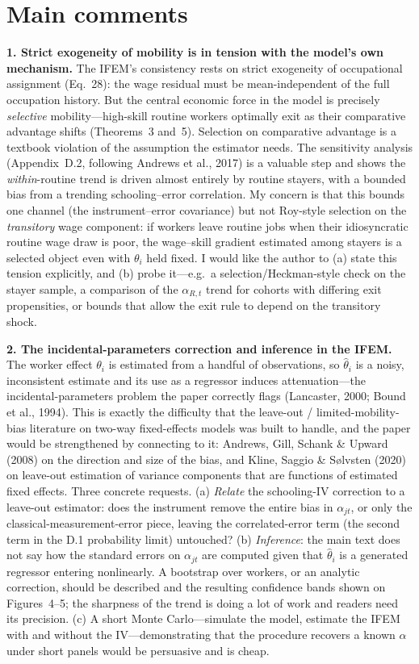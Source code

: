 \documentclass[11pt]{article}
\begin{document}
\section*{Main comments}

\textbf{1. Strict exogeneity of mobility is in tension with the model's own mechanism.}
The IFEM's consistency rests on strict exogeneity of occupational assignment (Eq.~28): the wage
residual must be mean-independent of the full occupation history. But the central economic force in
the model is precisely \emph{selective} mobility---high-skill routine workers optimally exit as their
comparative advantage shifts (Theorems~3 and~5). Selection on comparative advantage is a textbook
violation of the assumption the estimator needs. The sensitivity analysis (Appendix~D.2, following
Andrews et al., 2017) is a valuable step and shows the \emph{within}-routine trend is driven almost
entirely by routine stayers, with a bounded bias from a trending schooling--error correlation. My
concern is that this bounds one channel (the instrument--error covariance) but not Roy-style
selection on the \emph{transitory} wage component: if workers leave routine jobs when their
idiosyncratic routine wage draw is poor, the wage--skill gradient estimated among stayers is a
selected object even with $\theta_i$ held fixed. I would like the author to (a) state this tension
explicitly, and (b) probe it---e.g.\ a selection/Heckman-style check on the stayer sample, a
comparison of the $\alpha_{R,t}$ trend for cohorts with differing exit propensities, or bounds that
allow the exit rule to depend on the transitory shock.

\textbf{2. The incidental-parameters correction and inference in the IFEM.}
The worker effect $\theta_i$ is estimated from a handful of observations, so $\hat\theta_i$ is a
noisy, inconsistent estimate and its use as a regressor induces attenuation---the incidental-parameters
problem the paper correctly flags (Lancaster, 2000; Bound et al., 1994). This is exactly the
difficulty that the leave-out / limited-mobility-bias literature on two-way fixed-effects models was
built to handle, and the paper would be strengthened by connecting to it: Andrews, Gill, Schank \&
Upward (2008) on the direction and size of the bias, and Kline, Saggio \& S\o lvsten (2020) on
leave-out estimation of variance components that are functions of estimated fixed effects. Three
concrete requests. (a) \emph{Relate} the schooling-IV correction to a leave-out estimator: does the
instrument remove the entire bias in $\alpha_{jt}$, or only the classical-measurement-error piece,
leaving the correlated-error term (the second term in the D.1 probability limit) untouched? (b)
\emph{Inference}: the main text does not say how the standard errors on $\alpha_{jt}$ are computed
given that $\hat\theta_i$ is a generated regressor entering nonlinearly. A bootstrap over workers, or
an analytic correction, should be described and the resulting confidence bands shown on Figures~4--5;
the sharpness of the trend is doing a lot of work and readers need its precision. (c) A short Monte
Carlo---simulate the model, estimate the IFEM with and without the IV---demonstrating that the
procedure recovers a known $\alpha$ under short panels would be persuasive and is cheap.
\end{document}
